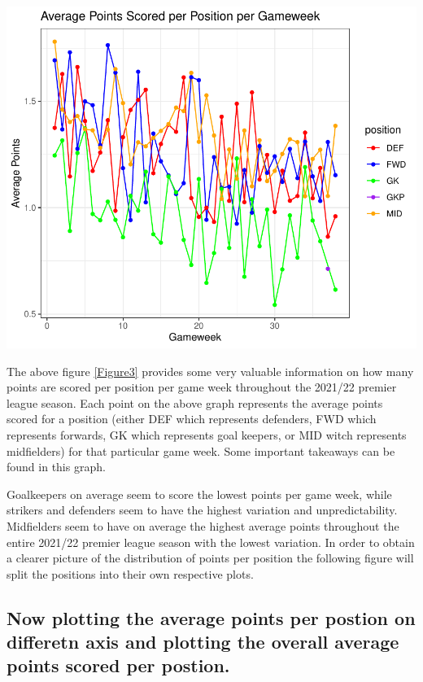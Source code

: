 \documentclass[11pt,preprint, authoryear]{elsarticle}
\let\origfigure\figure
\let\endorigfigure\endfigure
\renewenvironment{figure}[1][2] {
    \expandafter\origfigure\expandafter[H]
} {
    \endorigfigure
}
\numberwithin{equation}{section}
\numberwithin{figure}{section}
\numberwithin{table}{section}
\begin{document}
\begin{figure}[H]

{\centering \includegraphics{Fantasy_premier_league_team_prediction_files/figure-latex/unnamed-chunk-4-1} 

}

\caption{Average points per position combined plot\label{Figure3}}\label{fig:unnamed-chunk-4}
\end{figure}

The above figure \ref{Figure3} provides some very valuable information
on how many points are scored per position per game week throughout the
2021/22 premier league season. Each point on the above graph represents
the average points scored for a position (either DEF which represents
defenders, FWD which represents forwards, GK which represents goal
keepers, or MID witch represents midfielders) for that particular game
week. Some important takeaways can be found in this graph.

Goalkeepers on average seem to score the lowest points per game week,
while strikers and defenders seem to have the highest variation and
unpredictability. Midfielders seem to have on average the highest
average points throughout the entire 2021/22 premier league season with
the lowest variation. In order to obtain a clearer picture of the
distribution of points per position the following figure will split the
positions into their own respective plots.

\hypertarget{now-plotting-the-average-points-per-postion-on-differetn-axis-and-plotting-the-overall-average-points-scored-per-postion.}{%
\subsection{Now plotting the average points per postion on differetn
axis and plotting the overall average points scored per
postion.}\label{now-plotting-the-average-points-per-postion-on-differetn-axis-and-plotting-the-overall-average-points-scored-per-postion.}}
\end{document}
